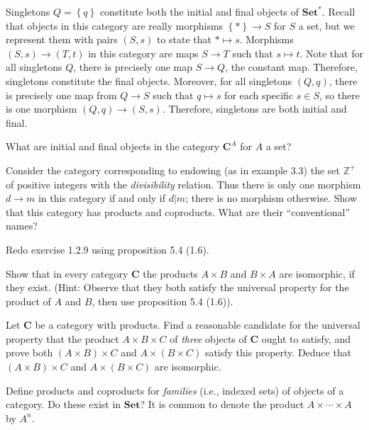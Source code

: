 \documentclass[11pt]{report}
\begin{document}
\begin{solution}
	Singletons $Q=\left\{ q \right\} $ constitute both the initial and final objects of $\mathbf{Set}^*$. Recall that objects in this category are really morphisms $\left\{ * \right\} \to S$ for $S$ a set, but we represent them with pairs $(S,s)$ to state that $*\mapsto s$. Morphisms $(S,s)\to (T,t)$ in this category are maps $S\to T$ such that $s\mapsto t$. Note that for all singletons $Q$, there is precisely one map $S\to Q$, the constant map. Therefore, singletons constitute the final objects. Moreover, for all singletons $(Q,q)$, there is precisely one map from $Q\to S$ such that $q\mapsto s$ for each specific $s\in S$, so there is one morphism $(Q,q)\to (S,s)$. Therefore, singletons are both initial and final.
\end{solution}
\begin{exercise}
	What are initial and final objects in the category $\mathbf{C}^A$ for $A$ a set?
\end{exercise}
\begin{exercise}
	Consider the category corresponding to endowing (as in example 3.3) the set $\mathbb{Z}^+$ of positive integers with the \emph{divisibility} relation. Thus there is only one morphism $d\to m$ in this category if and only if $d|m$; there is no morphism otherwise. Show that this category has products and coproducts. What are their ``conventional'' names?
\end{exercise}
\begin{exercise}
	Redo exercise 1.2.9 using proposition 5.4 (1.6).
\end{exercise}
\begin{exercise}
	Show that in every category $\mathbf{C}$ the products $A\times B$ and $B\times A$ are isomorphic, if they exist. (Hint: Observe that they both satisfy the universal property for the product of $A$ and $B$, then use proposition 5.4 (1.6)).
\end{exercise}
\begin{exercise}
	Let $\mathbf{C}$ be a category with products. Find a reasonable candidate  for the universal property that the product $A\times B\times C$ of \emph{three} objects of $\mathbf{C}$ ought to satisfy, and prove both $(A\times B)\times C$ and $A\times (B\times C)$ satisfy this property. Deduce that $(A\times B)\times C$ and $A\times (B\times C)$ are isomorphic.
\end{exercise}
\begin{exercise}
	Define products and coproducts for \emph{families} (i.e., indexed sets) of objects of a category. Do these exist in $\mathbf{Set}$? It is common to denote the product $A\times \cdots \times A$ by $A^n$.
\end{exercise}
\end{document}
